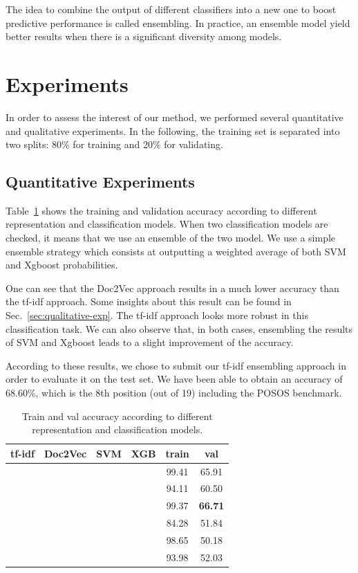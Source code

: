 \documentclass[11pt,twocolumn,letterpaper]{article}
\newcommand{\cmark}{\ding{51}}%
\begin{document}
The idea to combine the output of different classifiers into a new one to boost predictive performance is called ensembling. In practice, an ensemble model yield better results when there is a significant diversity among models.

\section{Experiments}

In order to assess the interest of our method, we performed several quantitative and qualitative experiments. In the following, the training set is separated into two splits: 80\% for training and 20\% for validating. 

\subsection{Quantitative Experiments}

Table~\ref{tab:experiments} shows the training and validation accuracy according to different representation and classification models. When two classification models are checked, it means that we use an ensemble of the two model. We use a simple ensemble strategy which consists at outputting a weighted average of both SVM and Xgboost probabilities.

One can see that the Doc2Vec approach results in a much lower accuracy than the tf-idf approach. Some insights about this result can be found in Sec.~\ref{sec:qualitative-exp}. The tf-idf approach looks more robust in this classification task. We can also observe that, in both cases, ensembling the results of SVM and Xgboost leads to a slight improvement of the accuracy.

According to these results, we chose to submit our tf-idf ensembling approach in order to evaluate it on the test set. We have been able to obtain an accuracy of 68.60\%, which is the 8th position (out of 19) including the POSOS benchmark.

\begin{table}[t!]
\centering
\begin{tabular}{|c|c||c|c||c|c|}
\hline
tf-idf & Doc2Vec & SVM & XGB & train & val\\
\hline
\hline
\cmark & & \cmark & & 99.41 & 65.91 \\
\hline
\cmark & & & \cmark & 94.11 & 60.50 \\
\hline
\cmark & & \cmark & \cmark & 99.37 & \textbf{66.71} \\
\hline
\hline
& \cmark & \cmark & & 84.28 & 51.84 \\
\hline
& \cmark & & \cmark & 98.65 & 50.18 \\
\hline
& \cmark & \cmark & \cmark & 93.98 & 52.03 \\
\hline
\end{tabular}
\caption{Train and val accuracy according to different representation and classification models.}
\label{tab:experiments}
\end{table}
\end{document}
